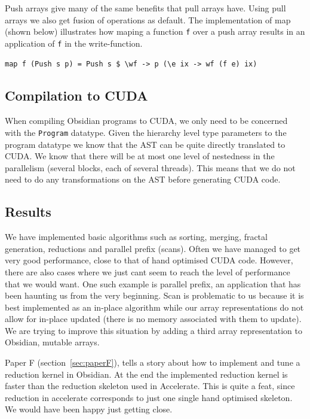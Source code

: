 \documentclass[a4paper]{book}
\begin{document}
Push arrays give many of the same benefits that pull arrays have. Using pull 
arrays we also get fusion of operations as default. The implementation of map 
(shown below) illustrates how maping a function {\tt f} over a push array results 
in an application of {\tt f} in the write-function. 

\begin{verbatim} 
map f (Push s p) = Push s $ \wf -> p (\e ix -> wf (f e) ix)
\end{verbatim}

\subsection{Compilation to CUDA}

When compiling Obsidian programs to CUDA, we only need to be concerned with the 
{\tt Program} datatype. Given the hierarchy level type parameters to the program datatype 
we know that the AST can be quite directly translated to CUDA. We know that there will 
be at most one level of nestedness in the parallelism (several blocks, each of several threads). 
This means that we do not need to do any transformations on the AST before generating CUDA code. 

\subsection{Results}

We have implemented basic algorithms such as sorting, merging, fractal generation, reductions and parallel prefix (scans). Often we have managed to get very good performance, close to that 
of hand optimised CUDA code. However, there are also cases where we just cant seem to reach 
the level of performance that we would want. One such example is parallel prefix, an 
application that has been haunting us from the very beginning. Scan is problematic to us because 
it is best implemented as an in-place algorithm while our array representations do 
not allow for in-place updated (there is no memory associated with them to update). 
We are trying to improve this situation by adding a third array representation to Obsidian,
mutable arrays.   

Paper F (section~\ref{sec:paperF}), tells a story about how to implement and tune 
a reduction kernel in Obsidian. At the end the implemented reduction kernel is 
faster than the reduction skeleton used in Accelerate. This is quite a feat, since 
reduction in accelerate corresponds to just one single hand optimised skeleton. We would have 
been happy just getting close.   
\end{document}
